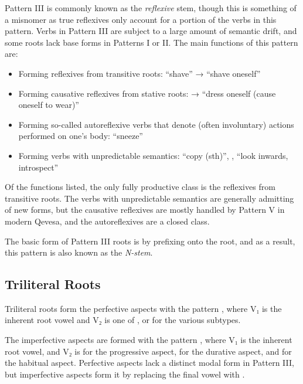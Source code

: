 \documentclass[grammar]{subfiles}
\begin{document}
Pattern III is commonly known as the \emph{reflexive} stem, though this is
something of a misnomer as true reflexives only account for a portion of the
verbs in this pattern.  Verbs in Pattern III are subject to a large amount of
semantic drift, and some roots lack base forms in Patterns I or II.  The main
functions of this pattern are: 

\begin{itemize}
  \item Forming reflexives from transitive roots:  “shave” → 
    “shave oneself”
  \item Forming causative reflexives from stative roots:  →
     “dress oneself (cause oneself to wear)”
  \item Forming so-called autoreflexive verbs that denote (often involuntary)
    actions performed on one’s body:  “sneeze”
  \item Forming verbs with unpredictable semantics:  “copy (sth)”,
    ,  “look inwards, introspect”
\end{itemize}

Of the functions listed, the only fully productive class is the reflexives from
transitive roots.  The verbs with unpredictable semantics are generally
admitting of new forms, but the causative reflexives are mostly handled by
Pattern V in modern Qevesa, and the autoreflexives are a closed class.

The basic form of Pattern III roots is by prefixing  onto the root, and as
a result, this pattern is also known as the \emph{N-stem}.


\subsection{Triliteral Roots}
\label{ssec:vm_iii_triliteral_roots}

Triliteral roots form the perfective aspects with the pattern ,
where V₁ is the inherent root vowel and V₂ is one of ,  or 
for the various subtypes.  

The imperfective aspects are formed with the pattern ,
where V₁ is the inherent root vowel, and V₂ is  for the progressive
aspect,  for the durative aspect, and  for the habitual aspect.
Perfective aspects lack a distinct modal form in Pattern III, but imperfective
aspects form it by replacing the final vowel with . 
\end{document}
